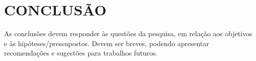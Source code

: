 \chapter{\textbf{CONCLUSÃO}}

As conclusões devem responder às questões da pesquisa, em relação aos objetivos e às hipóteses/pressupostos. Devem ser breves, podendo apresentar recomendações e sugestões para trabalhos futuros.